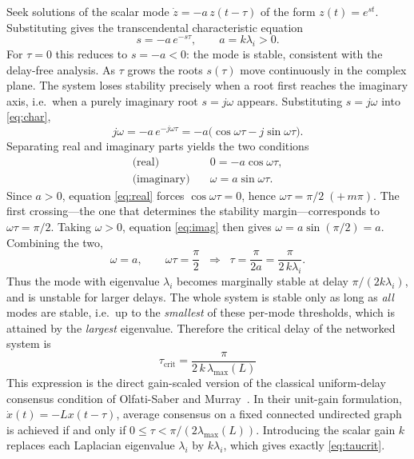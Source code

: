 \documentclass[11pt,a4paper]{article}
\newcommand{\Lap}{L}
\newcommand{\taucrit}{\tau_{\mathrm{crit}}}
\newcommand{\lammax}{\lambda_{\max}}
\begin{document}
Seek solutions of the scalar mode $\dot z = -a\,z(t-\tau)$ of the form $z(t)=e^{st}$. Substituting
gives the transcendental characteristic equation
\begin{equation}
s = -a\,e^{-s\tau}, \qquad a = k\lambda_i > 0.
\label{eq:char}
\end{equation}
For $\tau=0$ this reduces to $s=-a<0$: the mode is stable, consistent with the delay-free
analysis. As $\tau$ grows the roots $s(\tau)$ move continuously in the complex plane. The
system loses stability precisely when a root first reaches the imaginary axis, i.e.\ when a
purely imaginary root $s=j\omega$ appears. Substituting $s=j\omega$ into \eqref{eq:char},
\begin{equation}
j\omega = -a\,e^{-j\omega\tau}
        = -a\bigl(\cos\omega\tau - j\sin\omega\tau\bigr).
\label{eq:char_imag}
\end{equation}
Separating real and imaginary parts yields the two conditions
\begin{align}
\text{(real)}      &\quad 0 = -a\cos\omega\tau, \label{eq:real}\\
\text{(imaginary)} &\quad \omega = a\sin\omega\tau. \label{eq:imag}
\end{align}
Since $a>0$, equation \eqref{eq:real} forces $\cos\omega\tau=0$, hence
$\omega\tau = \pi/2 \;(+\,m\pi)$. The first crossing---the one that determines the stability
margin---corresponds to $\omega\tau=\pi/2$. Taking $\omega>0$, equation \eqref{eq:imag} then
gives $\omega = a\sin(\pi/2) = a$. Combining the two,
\begin{equation}
\omega = a, \qquad \omega\tau = \frac{\pi}{2}
\;\;\Longrightarrow\;\;
\tau = \frac{\pi}{2a} = \frac{\pi}{2\,k\lambda_i}.
\label{eq:tau_mode}
\end{equation}
Thus the mode with eigenvalue $\lambda_i$ becomes marginally stable at delay
$\pi/(2k\lambda_i)$, and is unstable for larger delays. The whole system is stable only as long
as \emph{all} modes are stable, i.e.\ up to the \emph{smallest} of these per-mode thresholds,
which is attained by the \emph{largest} eigenvalue. Therefore the critical delay of the
networked system is
\begin{equation}
\boxed{\;\taucrit = \dfrac{\pi}{2\,k\,\lammax(\Lap)}\;}
\label{eq:taucrit}
\end{equation}
This expression is the direct gain-scaled version of the classical uniform-delay consensus
condition of Olfati-Saber and Murray~\cite{olfati2004consensus}. In their unit-gain formulation,
\(\dot x(t)=-Lx(t-\tau)\), average consensus on a fixed connected undirected graph is achieved
if and only if \(0\leq\tau<\pi/(2\lambda_{\max}(L))\). Introducing the scalar gain \(k\) replaces
each Laplacian eigenvalue \(\lambda_i\) by \(k\lambda_i\), which gives exactly
\eqref{eq:taucrit}.
\end{document}
